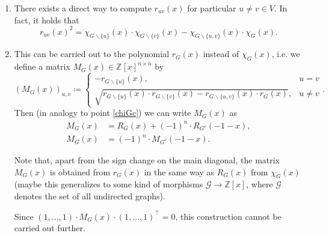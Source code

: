 \documentclass[a4paper,12pt]{article}
\begin{document}
\begin{enumerate}
\item 
There exists a direct way to compute $r_{uv}(x)$ for particular $u \neq v \in V$. In fact, it holds that
$$
r_{uv}(x)^2 = \chi_{G\backslash \{u\}}(x)\cdot \chi_{G\backslash\{v\}}(x) - \chi_{G\backslash\{u,v\}}(x)\cdot\chi_G(x).
$$

\item 
This can be carried out to the polynomial $r_G(x)$ instead of $\chi_G(x)$, i.e. we define a matrix $M_G(x) \in \mathbb{Z}[x]^{n \times n}$ by
$$
\left(M_G(x)\right)_{u,v} \coloneqq \begin{cases}
-r_{G\backslash\{u\}}(x), &u = v\\
\sqrt{r_{G\backslash\{u\}}(x) \cdot r_{G\backslash\{v\}}(x) - r_{G\backslash \{u,v\}}(x) \cdot r_G(x)}, &u \neq v
\end{cases}.
$$
Then (in analogy to point \ref{chiGc}) we can write $M_G(x)$ as
\begin{align*}
M_G(x) &= R_G(x) + (-1)^n \cdot R_{G^c}(-1-x),\\
M_G(x) &= (-1)^n \cdot M_{G^c}(-1-x).
\end{align*}

Note that, apart from the sign change on the main diagonal, the matrix $M_G(x)$ is obtained from $r_G(x)$ in the same way as $R_G(x)$ from $\chi_G(x)$ (maybe this generalizes to some kind of morphisms $\mathcal{G}\to\mathbb{Z}[x]$, where $\mathcal{G}$ denotes the set of all undirected graphs).

Since $(1, \ldots, 1) \cdot M_G(x) \cdot (1, \ldots, 1)^\top = 0$, this construction cannot be carried out further.
\end{enumerate}
\end{document}
